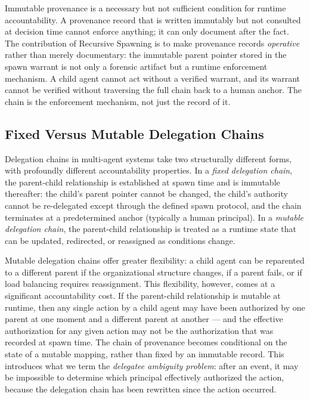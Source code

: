 Immutable provenance is a necessary but not sufficient condition for runtime accountability. A provenance record that is written immutably but not consulted at decision time cannot enforce anything; it can only document after the fact. The contribution of Recursive Spawning is to make provenance records \emph{operative} rather than merely documentary: the immutable parent pointer stored in the spawn warrant is not only a forensic artifact but a runtime enforcement mechanism. A child agent cannot act without a verified warrant, and its warrant cannot be verified without traversing the full chain back to a human anchor. The chain is the enforcement mechanism, not just the record of it.

\subsection{Fixed Versus Mutable Delegation Chains}

Delegation chains in multi-agent systems take two structurally different forms, with profoundly different accountability properties. In a \emph{fixed delegation chain}, the parent-child relationship is established at spawn time and is immutable thereafter: the child's parent pointer cannot be changed, the child's authority cannot be re-delegated except through the defined spawn protocol, and the chain terminates at a predetermined anchor (typically a human principal). In a \emph{mutable delegation chain}, the parent-child relationship is treated as a runtime state that can be updated, redirected, or reassigned as conditions change.

Mutable delegation chains offer greater flexibility: a child agent can be reparented to a different parent if the organizational structure changes, if a parent fails, or if load balancing requires reassignment. This flexibility, however, comes at a significant accountability cost. If the parent-child relationship is mutable at runtime, then any single action by a child agent may have been authorized by one parent at one moment and a different parent at another --- and the effective authorization for any given action may not be the authorization that was recorded at spawn time. The chain of provenance becomes conditional on the state of a mutable mapping, rather than fixed by an immutable record. This introduces what we term the \emph{delegatee ambiguity problem}: after an event, it may be impossible to determine which principal effectively authorized the action, because the delegation chain has been rewritten since the action occurred.


